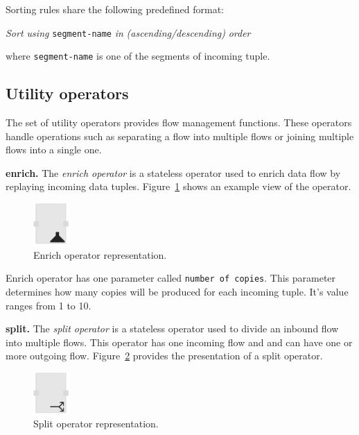 Sorting rules share the following predefined format:

\textit{Sort using} \texttt{segment-name} \textit{in} \textit{(ascending/descending)} \textit{order}

where \texttt{segment-name} is one of the segments of incoming tuple.

\subsection{Utility operators}
\label{sec:utility operators}
The set of utility operators provides flow management functions. These operators 
handle operations such as separating a flow into multiple flows or joining multiple 
flows into a single one.

\textbf{enrich.}
The \textit{enrich operator} is a stateless operator used to enrich data flow by 
replaying incoming data tuples. Figure~\ref{fig:enrich operator} shows an example 
view of the operator.

\begin{figure}[ht]
	\centering
	\includegraphics[height=60px]{figures/EnrichOperator.pdf}
	\caption{Enrich operator representation.}
	\label{fig:enrich operator}
\end{figure}

Enrich operator has one parameter called \texttt{number of copies}. This parameter 
determines how many copies will be produced for each incoming tuple. It's value 
ranges from 1 to 10.

\textbf{split.}
The \textit{split operator} is a stateless operator used to divide an inbound flow 
into multiple flows. This operator has one incoming flow and and can have one or 
more outgoing flow. Figure~\ref{fig:split operator} provides the presentation of a 
split operator.

\begin{figure}[ht]
	\centering
	\includegraphics[height=60px]{figures/SplitOperator.pdf}
	\caption{Split operator representation.}
	\label{fig:split operator}
\end{figure}


